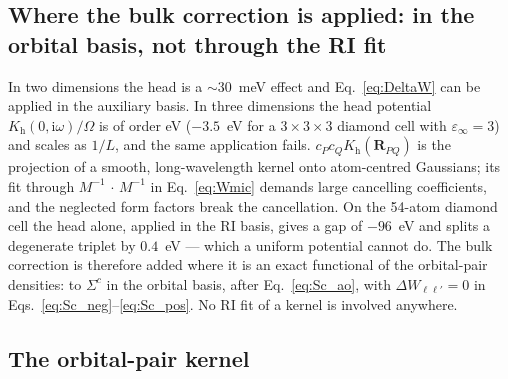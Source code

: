 \documentclass[%
 reprint,
superscriptaddress,
 amsmath,amssymb,
 aps,
prb,
]{revtex4-2}
\newcommand{\bR}{\mathbf{R}}
\newcommand{\ii}{\mathrm{i}}
\newcommand{\head}{\mathrm{h}}
\begin{document}
\subsection{Where the bulk correction is applied: in the orbital basis, not through the RI fit}
\label{sec:where3d}

In two dimensions the head is a $\sim30$~meV effect and Eq.~\eqref{eq:DeltaW} can be applied
in the auxiliary basis. In three dimensions the head potential $K_\head(0,\ii\omega)/\Omega$ is
of order eV ($-3.5$~eV for a $3\times3\times3$ diamond cell with $\varepsilon_\infty = 3$) and
scales as $1/L$, and the same application fails. $c_P c_Q K_\head(\bR_{PQ})$ is the projection
of a smooth, long-wavelength kernel onto atom-centred Gaussians; its fit through
$M^{-1}\,\cdot\,M^{-1}$ in Eq.~\eqref{eq:Wmic} demands large cancelling coefficients, and the
neglected form factors break the cancellation. On the 54-atom diamond cell the head alone,
applied in the RI basis, gives a gap of $-96$~eV and splits a degenerate triplet by $0.4$~eV
--- which a uniform potential cannot do. The bulk correction is therefore added where it is an
exact functional of the orbital-pair densities: to $\Sigma^c$ in the orbital basis, after
Eq.~\eqref{eq:Sc_ao}, with $\Delta W_{\ell\ell'}=0$ in Eqs.~\eqref{eq:Sc_neg}--\eqref{eq:Sc_pos}.
No RI fit of a kernel is involved anywhere.

\subsection{The orbital-pair kernel}
\label{sec:What}
\end{document}
